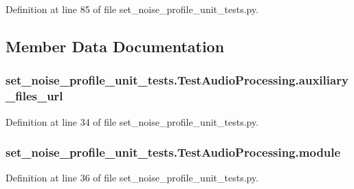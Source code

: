 Definition at line 85 of file set\-\_\-noise\-\_\-profile\-\_\-unit\-\_\-tests.\-py.



\subsection{Member Data Documentation}
\hypertarget{classset__noise__profile__unit__tests_1_1TestAudioProcessing_af90ba77fd1a22f2ef9bf1150ed7755bc}{
\subsubsection[{auxiliary\-\_\-files\-\_\-url}]{\setlength{\rightskip}{0pt plus 5cm}set\-\_\-noise\-\_\-profile\-\_\-unit\-\_\-tests.\-Test\-Audio\-Processing.\-auxiliary\-\_\-files\-\_\-url}}\label{classset__noise__profile__unit__tests_1_1TestAudioProcessing_af90ba77fd1a22f2ef9bf1150ed7755bc}


Definition at line 34 of file set\-\_\-noise\-\_\-profile\-\_\-unit\-\_\-tests.\-py.

\hypertarget{classset__noise__profile__unit__tests_1_1TestAudioProcessing_aa8588c51c5c1fc980988138c0ee6f8c8}{
\subsubsection[{module}]{\setlength{\rightskip}{0pt plus 5cm}set\-\_\-noise\-\_\-profile\-\_\-unit\-\_\-tests.\-Test\-Audio\-Processing.\-module}}\label{classset__noise__profile__unit__tests_1_1TestAudioProcessing_aa8588c51c5c1fc980988138c0ee6f8c8}


Definition at line 36 of file set\-\_\-noise\-\_\-profile\-\_\-unit\-\_\-tests.\-py.

